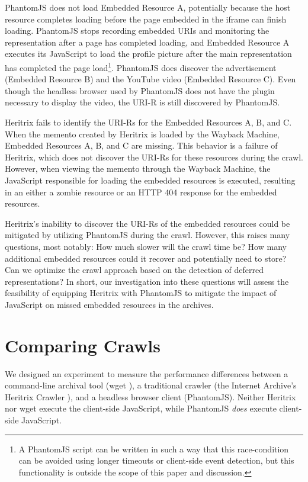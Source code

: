 \documentclass{sig-alternate}
\begin{document}
PhantomJS does not load Embedded Resource A, potentially because the host resource completes loading before the page embedded in the iframe can finish loading. PhantomJS stops recording embedded URIs and monitoring the representation after a page has completed loading, and Embedded Resource A executes its JavaScript to load the profile picture after the main representation has completed the page load\footnote{A PhantomJS script can be written in such a way that this race-condition can be avoided using longer timeouts or client-side event detection, but this functionality is outside the scope of this paper and discussion.}. PhantomJS does discover the advertisement (Embedded Resource B) and the YouTube video (Embedded Resource C). Even though the headless browser used by PhantomJS does not have the plugin necessary to display the video, the URI-R is still discovered by PhantomJS.

Heritrix fails to identify the URI-Rs for the Embedded Resources A, B, and C. When the memento created by Heritrix is loaded by the Wayback Machine, Embedded Resources A, B, and C are missing. This behavior is a failure of Heritrix, which does not discover the URI-Rs for these resources during the crawl. However, when viewing the memento through the Wayback Machine, the JavaScript responsible for loading the embedded resources is executed, resulting in an either a zombie resource \cite{zombies} or an HTTP 404 response for the embedded resources.

Heritrix's inability to discover the URI-Rs of the embedded resources could be mitigated by utilizing PhantomJS during the crawl. However, this raises many questions, most notably: How much slower will the crawl time be? How many additional embedded resources could it recover and potentially need to store? Can we optimize the crawl approach based on the detection of deferred representations? In short, our investigation into these questions will assess the feasibility of equipping Heritrix with PhantomJS to mitigate the impact of JavaScript on missed embedded resources in the archives.


\vskip -3mm
\section{Comparing Crawls}
\label{performance}
We designed an experiment to measure the performance differences between a command-line archival tool (wget \cite{wget}), a traditional crawler (the Internet Archive's Heritrix Crawler \cite{heritrix, Sigurosson:Incremental-Heritrix}), and a headless browser client (PhantomJS). Neither Heritrix nor wget execute the client-side JavaScript, while PhantomJS \emph{does} execute client-side JavaScript.
\end{document}
